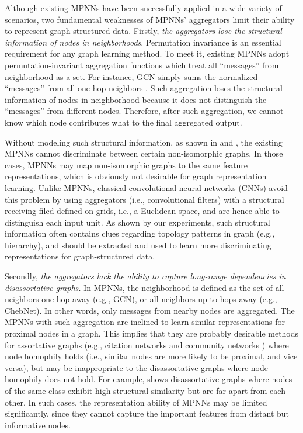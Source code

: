 \documentclass{article} \usepackage{iclr2020_conference,times}
\begin{document}
Although existing MPNNs have been successfully applied in a wide variety of scenarios, two fundamental weaknesses of MPNNs' aggregators limit their ability to represent graph-structured data.
Firstly, \emph{the aggregators lose the structural information of nodes in neighborhoods}.
Permutation invariance is an essential requirement for any graph learning method. 
To meet it, existing MPNNs adopt permutation-invariant aggregation functions which treat all ``messages'' from neighborhood as a set.
For instance, GCN simply sums the normalized ``messages'' from all one-hop neighbors \citep{DBLP:conf/iclr/KipfW17}.
Such aggregation loses the structural information of nodes in neighborhood because it does not distinguish the ``messages'' from different nodes. 
Therefore, after such aggregation, we cannot know which node contributes what to the final aggregated output.



Without modeling such structural information, as shown in \citep{DBLP:conf/iclr/KondorSPAT18} and \citep{xu2018how}, the existing MPNNs cannot discriminate between certain non-isomorphic graphs.
In those cases, MPNNs may map non-isomorphic graphs to the same feature representations, which is obviously not desirable for graph representation learning.
Unlike MPNNs, classical convolutional neural networks (CNNs) avoid this problem by using aggregators (i.e., convolutional filters) with a structural receiving filed defined on grids, i.e., a Euclidean space, and are hence able to distinguish each input unit.
As shown by our experiments, such structural information often contains clues regarding topology patterns in graph (e.g., hierarchy), and should be extracted and used to learn more discriminating representations for graph-structured data.

Secondly, \emph{the aggregators lack the ability to capture long-range dependencies in disassortative graphs.}
In MPNNs, the neighborhood is defined as the set of all neighbors one hop away (e.g., GCN), or all neighbors up to  hops away (e.g., ChebNet).
In other words, only messages from nearby nodes are aggregated.
The MPNNs with such aggregation are inclined to learn similar representations for proximal nodes in a graph.
This implies that they are probably desirable methods for assortative graphs (e.g., citation networks \citep{DBLP:conf/iclr/KipfW17} and community networks \citep{chen2018supervised}) where node homophily holds (i.e., similar nodes are more likely to be proximal, and vice versa), but may be inappropriate to the disassortative graphs \citep{newman2002assortative} where node homophily does not hold. 
For example, \cite{DBLP:conf/kdd/RibeiroSF17} shows disassortative graphs where nodes of the same class exhibit high structural similarity but are far apart from each other.
In such cases, the representation ability of MPNNs may be limited significantly, since they cannot capture the important features from distant but informative nodes.
\end{document}

